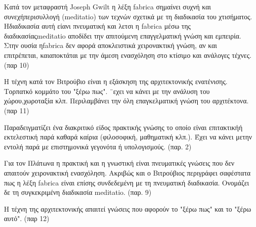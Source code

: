 
Κατά τον μεταφραστή Joseph Gwilt η λέξη fabrica σημαίνει συχνή και συνεχήπερισυλλογή (meditatio) των τεχνών σχετικά με τη διαδικασία του χτισήματος. Ηδιαδικασία αυτή είανι πνευματική και λετσι η fabrica μέσω της διαδικασίαςmeditatio αποδίδει την απιτούμενη επαγγελματική γνώση και εμπειρία. Στην ουσία ηfabrica δεν αφορά αποκλειστικά χειρονακτική γνώση, αν και επιτρέπεται, καιαποκτάται με την άμεση ενασχόληση στο κτίσιμο και ανάλογες τέχνες. (παρ 10)

Η τέχνη κατά τον Βιτρούβιο είναι η εξάσκηση της αρχιτεκτονικής ενατένισης. Τορπατκό κομμάτο του "ξέρω πως". ¨εχει να κάνει με την ανάλυση του χώρου,χωροταξία κλπ. Περιλαμβάνει την όλη επαγκελματική γνώση του αρχιτέκτονα. (παρ
11)






Παραδειγματίζει ένα διακριτικό είδος πρακτικής γνώσης το οποίο είναι επιτακτικήή εκτελεστική παρά καθαρά καίρια (φιλοσοφική, μαθηματική κλπ.). Έχει να κάνει μετην εντολή παρά με επιστημονικά γεγονότα ή υπολογισμούς. (παρ. 2)


Για τον Πλάτωνα η πρακτική και η γνωστική είναι πνευματικές γνώσεις που δεν απαιτούν χειρονακτική ενασχόληση. Ακριβώς και ο Βιτρούβιος περιγράφει σαφέστατα πως η λέξη fabrica είναι επίσης συνδεδεμένη με τη πνευματική διαδικασία. Ονομάζει δε τη συγκεκριμένη διαδικασία meditatio. (παρ. 9)

Η τέχνη της αρχιτεκτονικής απαιτεί γνώσεις που αφορούν το "ξέρω πως" και το "ξέρω αυτό". (παρ 12)

